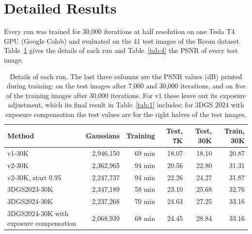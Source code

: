 \documentclass[11pt,a4paper]{article}
\begin{document}


\clearpage
\section{Detailed Results}
\label{app:c}

Every run was trained for 30,000 iterations at half resolution on one Tesla T4 GPU (Google Colab) and evaluated on the 41 test images of the Room dataset. Table~\ref{tab:3} gives the details of each run and Table~\ref{tab:4} the PSNR of every test image.

\begin{table}[H]
\centering
\caption{Details of each run. The last three columns are the PSNR values (dB) printed during training: on the test images after 7,000 and 30,000 iterations, and on five of the training images after 30,000 iterations. For v1 these leave out its exposure adjustment, which its final result in Table~\ref{tab:1} includes; for 3DGS 2024 with exposure compensation the test values are for the right halves of the test images.}
\label{tab:3}
\small
\begin{tabular}{@{}lrrrrr@{}}
\toprule
Method & Gaussians & Training & Test, 7K & Test, 30K & Train, 30K \\
\midrule
v1-30K & 2,946,150 & 69 min & 18.07 & 18.10 & 20.87 \\
v2-30K & 2,362,965 & 94 min & 20.56 & 22.80 & 31.31 \\
v2-30K, start 0.95 & 2,247,737 & 94 min & 22.26 & 24.27 & 31.87 \\
3DGS2023-30K & 2,347,189 & 58 min & 23.10 & 25.68 & 32.76 \\
3DGS2024-30K & 2,237,268 & 70 min & 24.63 & 27.25 & 33.16 \\
3DGS2024-30K with exposure compensation & 2,068,939 & 68 min & 24.45 & 28.84 & 33.16 \\
\bottomrule
\end{tabular}
\end{table}
\end{document}
